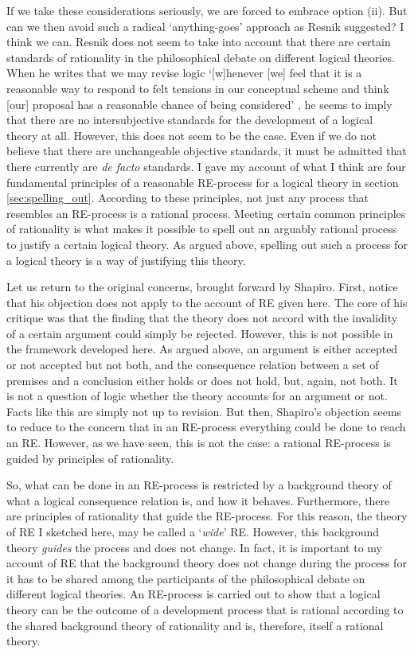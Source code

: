 \documentclass{article}
\begin{document}
If we take these considerations seriously, we are forced to embrace option (ii). But can we then avoid such a radical `anything-goes' approach as Resnik suggested? I think we can. Resnik does not seem to take into account that there are certain standards of rationality in the philosophical debate on different logical theories. When he writes that we may revise logic 
`[w]henever [we] feel that it is a reasonable way to respond to felt tensions in our conceptual scheme and think [our] proposal has a reasonable chance of being considered' \cite[p.~190]{resnik2}, he seems to imply that there are no intersubjective standards for the development of a logical theory at all. However, this does not seem to be the case. Even if we do not believe that there are unchangeable objective standards, it must be admitted that there currently are \textit{de facto} standards. I gave my account of what I think are four fundamental principles of a reasonable RE-process for a logical theory in section \ref{sec:spelling_out}. According to these principles, not just any process that resembles an RE-process is a rational process. Meeting certain common principles of rationality is what makes it possible to spell out an arguably rational process to justify a certain logical theory. As argued above, spelling out such a process for a logical theory is a way of justifying this theory. 

Let us return to the original concerns, brought forward by Shapiro. First, notice that his objection does not apply to the account of RE given here. The core of his critique was that the finding that the theory does not accord with the invalidity of a certain argument could simply be rejected. However, this is not possible in the framework developed here. As argued above, an argument is either accepted or not accepted but not both, and the consequence relation between a set of premises and a conclusion either holds or does not hold, but, again, not both. It is not a question of logic whether the theory accounts for an argument or not. Facts like this are simply not up to revision. But then, Shapiro's objection seems to reduce to the concern that in an RE-process everything could be done to reach an RE. However, as we have seen, this is not the case: a rational RE-process is guided by principles of rationality. 

So, what can be done in an RE-process is restricted by a background theory of what a logical consequence relation is, and how it behaves. Furthermore, there are principles of rationality that guide the RE-process. For this reason, the theory of RE I sketched here, may be called a `\textit{wide}' RE. However, this background theory \textit{guides} the process and does not change. In fact, it is important to my account of RE that the background theory does not change during the process for it has to be shared among the participants of the philosophical debate on different logical theories. An RE-process is carried out to show that a logical theory can be the outcome of a development process that is rational according to the shared background theory of rationality and is, therefore, itself a rational theory.
\end{document}
